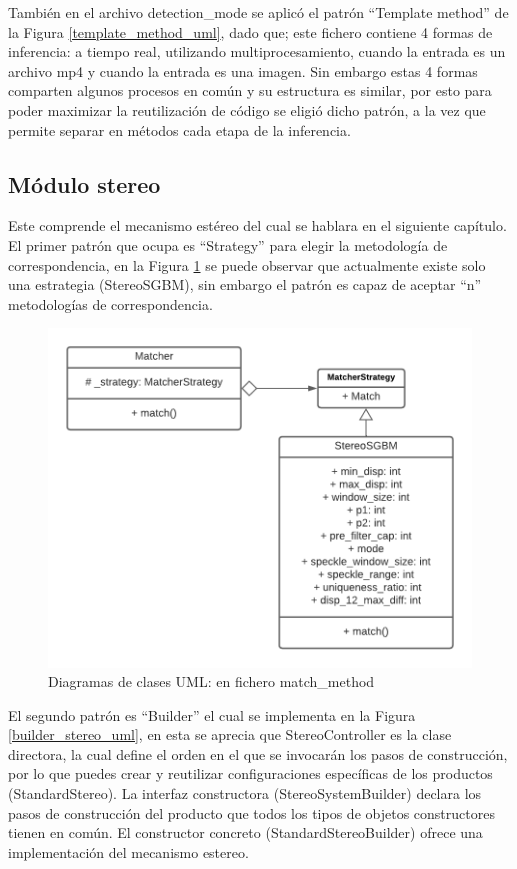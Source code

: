 También en el archivo detection\_mode se aplicó el patrón ``Template method'' de la Figura \ref{template_method_uml}, dado que; este fichero contiene 4 formas de inferencia: a tiempo real, utilizando multiprocesamiento, cuando la entrada es un archivo mp4 y cuando la entrada es una imagen. Sin embargo estas 4 formas comparten algunos procesos en común y su estructura es similar, por esto para poder maximizar la reutilización de código se eligió dicho patrón, a la vez que permite separar en métodos cada etapa de la inferencia.
\subsection{Módulo stereo}
Este comprende el mecanismo estéreo del cual se hablara en el siguiente capítulo. El primer patrón que ocupa es ``Strategy'' para elegir la metodología de correspondencia, en la Figura \ref{strategy_matcher_uml} se puede observar que actualmente existe solo una estrategia (StereoSGBM), sin embargo el patrón es capaz de aceptar ``n'' metodologías de correspondencia. 
\begin{figure}[H]
    \centering
    \includegraphics[scale=0.5]{Recursos/strategy_matcher_uml.png}
    \caption{Diagramas de clases UML: en fichero match\_method}
    \label{strategy_matcher_uml}
\end{figure}
El segundo patrón es ``Builder'' el cual se implementa en la Figura \ref{builder_stereo_uml}, en esta se aprecia que StereoController es la clase directora, la cual define el orden en el que se invocarán los pasos de construcción, por lo que puedes crear y reutilizar configuraciones específicas de los productos (StandardStereo). La interfaz constructora (StereoSystemBuilder) declara los pasos de construcción del producto que todos los tipos de objetos constructores tienen en común. El constructor concreto (StandardStereoBuilder) ofrece una implementación del mecanismo estereo.
